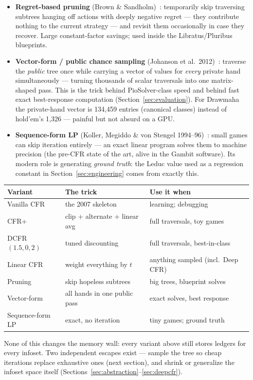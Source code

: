 \begin{itemize}
\item \textbf{Regret-based pruning} (Brown \& Sandholm)~\cite{brown2015pruning}: temporarily skip traversing subtrees hanging off actions with deeply negative regret --- they contribute nothing to the current strategy --- and revisit them occasionally in case they recover. Large constant-factor savings; used inside the Libratus/Pluribus blueprints.
\item \textbf{Vector-form / public chance sampling} (Johanson et al.\ 2012)~\cite{johanson2012pcs}: traverse the \emph{public} tree once while carrying a vector of values for \emph{every} private hand simultaneously --- turning thousands of scalar traversals into one matrix-shaped pass. This is the trick behind PioSolver-class speed and behind fast exact best-response computation (Section~\ref{sec:evaluation}). For Drawmaha the private-hand vector is 134{,}459 entries (canonical classes) instead of hold'em's 1{,}326 --- painful but not absurd on a GPU.
\item \textbf{Sequence-form LP} (Koller, Megiddo \& von Stengel 1994--96)~\cite{koller1996}: small games can skip iteration entirely --- an exact linear program solves them to machine precision (the pre-CFR state of the art, alive in the Gambit software). Its modern role is generating \emph{ground truth}: the Leduc value used as a regression constant in Section~\ref{sec:engineering} comes from exactly this.
\end{itemize}

\begin{center}
\footnotesize
\begin{tabular}{@{}lll@{}}
\toprule
Variant & The trick & Use it when \\
\midrule
Vanilla CFR & the 2007 skeleton & learning; debugging \\
CFR+ & clip + alternate + linear avg & full traversals, toy games \\
DCFR$(1.5,0,2)$ & tuned discounting & full traversals, best-in-class \\
Linear CFR & weight everything by $t$ & anything sampled (incl.\ Deep CFR) \\
Pruning & skip hopeless subtrees & big trees, blueprint solves \\
Vector-form & all hands in one public pass & exact solves, best response \\
Sequence-form LP & exact, no iteration & tiny games; ground truth \\
\bottomrule
\end{tabular}
\end{center}

None of this changes the memory wall: every variant above still stores ledgers for every infoset. Two independent escapes exist --- sample the tree so cheap iterations replace exhaustive ones (next section), and shrink or generalize the infoset space itself (Sections~\ref{sec:abstraction}--\ref{sec:deepcfr}).
